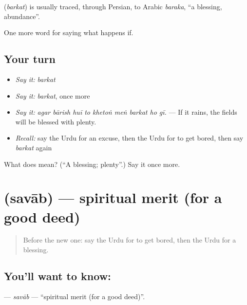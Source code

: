 \begin{cousinweb}
\textbf{} (\emph{barkat}) is usually traced, through Persian, to Arabic \emph{baraka}, \textquotedblleft{}a blessing, abundance\textquotedblright{}.
\end{cousinweb}

\begin{grammarlens}[title={What you've built}]
One more word for saying what happens if.
\end{grammarlens}

\subsection*{Your turn}
\begin{itemize}
\raggedright
  \item \emph{Say it:} \emph{barkat}
  \item \emph{Say it:} \emph{barkat}, once more
  \item \emph{Say it:} \emph{agar bārish huī to khetoṅ meṅ barkat ho gī.} — If it rains, the fields will be blessed with plenty.
  \item \emph{Recall:} say the Urdu for an excuse, then the Urdu for to get bored, then say \emph{barkat} again
\end{itemize}

\begin{tcolorbox}[breakable,colback=teal!4,colframe=teal!35!black,title={Before you move on}]
What does  mean? (\textquotedblleft{}A blessing; plenty\textquotedblright{}.) Say it once more.
\end{tcolorbox}
\section[\texorpdfstring{\ur{ثواب} (savāb)}{ثواب (savāb)}]{ (savāb) — spiritual merit (for a good deed)}

\label{lesson:UR-C528-savab}



\begin{quote}
Before the new one: say the Urdu for to get bored, then the Urdu for a blessing.
\end{quote}

\subsection*{You'll want to know: }
\textbf{} — \emph{savāb} — \textquotedblleft{}spiritual merit (for a good deed)\textquotedblright{}.

